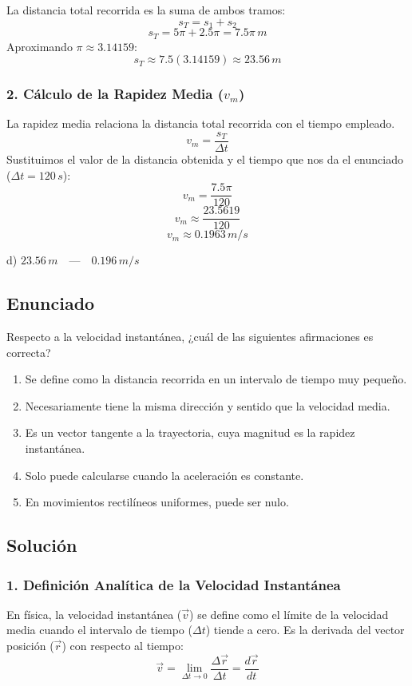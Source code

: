\documentclass[12pt, a4paper]{article}
\begin{document}
La distancia total recorrida es la suma de ambos tramos:
$$ s_T = s_1 + s_2 $$
$$ s_T = 5\pi + 2.5\pi = 7.5\pi \, \si{m} $$
Aproximando $\pi \approx 3.14159$:
$$ s_T \approx 7.5 (3.14159) \approx 23.56 \, \si{m} $$

\subsubsection*{2. Cálculo de la Rapidez Media ($v_m$)}
La rapidez media relaciona la distancia total recorrida con el tiempo empleado.
$$ v_m = \frac{s_T}{\Delta t} $$
Sustituimos el valor de la distancia obtenida y el tiempo que nos da el enunciado ($\Delta t = 120 \, \si{s}$):
$$ v_m = \frac{7.5\pi}{120} $$
$$ v_m \approx \frac{23.5619}{120} $$
$$ v_m \approx 0.1963 \, \si{m/s} $$

\begin{tcolorbox}[colback=green!5!white, colframe=green!50!black, title=Respuesta Final]
\centering \Large d) $23.56 \, \si{m} \quad \text{---} \quad 0.196 \, \si{m/s}$
\end{tcolorbox}

\newpage

\subsection*{Enunciado}
Respecto a la velocidad instantánea, ¿cuál de las siguientes afirmaciones es correcta?

\begin{enumerate}[label=\alph*)]
    \item Se define como la distancia recorrida en un intervalo de tiempo muy pequeño.
    \item Necesariamente tiene la misma dirección y sentido que la velocidad media.
    \item Es un vector tangente a la trayectoria, cuya magnitud es la rapidez instantánea.
    \item Solo puede calcularse cuando la aceleración es constante.
    \item En movimientos rectilíneos uniformes, puede ser nulo.
\end{enumerate}

\subsection*{Solución}

\subsubsection*{1. Definición Analítica de la Velocidad Instantánea}
En física, la velocidad instantánea ($\vec{v}$) se define como el límite de la velocidad media cuando el intervalo de tiempo ($\Delta t$) tiende a cero. Es la derivada del vector posición ($\vec{r}$) con respecto al tiempo:
$$ \vec{v} = \lim_{\Delta t \to 0} \frac{\Delta\vec{r}}{\Delta t} = \frac{d\vec{r}}{dt} $$
\end{document}
